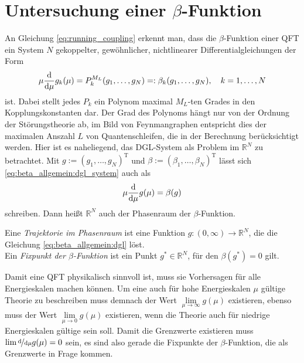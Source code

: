 \clearpage
\section{Untersuchung einer $\beta$-Funktion}


  An Gleichung \ref{eq:running_coupling} erkennt man, dass die $\beta$-Funktion einer 
  QFT ein System $N$ gekoppelter, gewöhnlicher, nichtlinearer 
  Differentialgleichungen der Form 
  \begin{equation}
   \mu \frac{\text{d}}{\text{d} \mu} g_k (\mu)  = P_k^{M_L}(g_1,\ldots, g_N)=:\beta_k(g_1,\ldots,g_N) 
   , \quad k=1,\ldots,N \label{eq:beta_allgemein:dgl_system}
  \end{equation}
  ist. Dabei stellt jedes $P_k$ ein Polynom maximal $M_L$-ten Grades in den Kopplungskonstanten 
  dar. Der Grad des Polynoms hängt nur von der Ordnung der Störungstheorie ab, im Bild von 
  Feynmangraphen entspricht dies der maximalen Anszahl $L$ von Quantenschleifen, die in 
  der Berechnung berücksichtigt werden. Hier ist es naheliegend, das DGL-System als Problem 
  im $\mathbb{R}^N$ zu betrachtet. Mit $g:=(g_1,\ldots,g_N)^\text{T}$ und 
  $\beta:=(\beta_1,\ldots,\beta_N)^\text{T}$ lässt sich \eqref{eq:beta_allgemein:dgl_system} 
  auch als
  \begin{equation}
   \mu \frac{\text{d}}{\text{d} \mu} g(\mu)=\beta(g) \label{eq:beta_allgemein:dgl}
  \end{equation}
  schreiben. Dann heißt $\mathbb{R}^N$ auch der Phasenraum der $\beta$-Funktion.
  \begin{definition}
  Eine \textit{Trajektorie im Phasenraum} ist eine Funktion $g:(0,\infty)\rightarrow \mathbb{R}^N$, 
  die die Gleichung \eqref{eq:beta_allgemein:dgl} löst.\\
  Ein \textit{Fixpunkt der $\beta$-Funktion} ist ein Punkt $g^*\in \mathbb{R}^N$, für den
   $\beta(g^*)=0$ gilt.
  \end{definition}
  Damit eine QFT physikalisch sinnvoll ist, muss sie Vorhersagen für alle Energieskalen machen 
  können. Um eine auch für hohe Energieskalen $\mu$ gültige Theorie zu beschreiben muss demnach 
  der Wert $\lim\limits_{\mu\to\infty} g(\mu)$ existieren, ebenso muss der Wert $\lim\limits_{
  \mu\to 0}g(\mu)$ existieren, wenn die Theorie auch für niedrige Energieskalen gültige sein soll. 
  Damit die Grenzwerte existieren muss $\lim\nicefrac{\text{d} }{\text{d} \mu} g(\mu)
  =0$ sein, es sind also gerade die Fixpunkte der $\beta$-Funktion, die als Grenzwerte 
  in Frage kommen.
  
